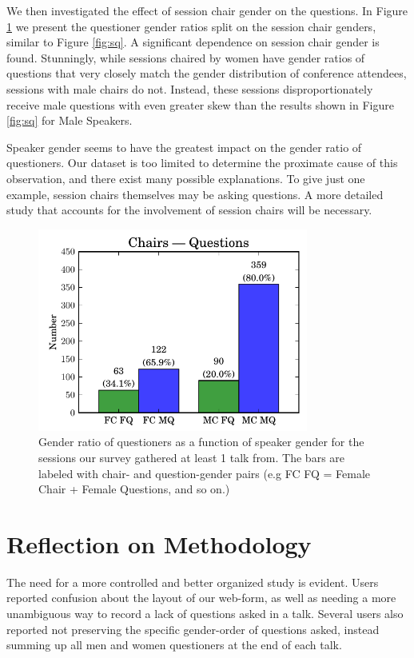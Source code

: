 \documentclass[iop]{emulateapj}
\begin{document}
We then investigated the effect of session chair gender on the questions. In Figure \ref{fig:chairs} we present the questioner gender ratios split on the session chair genders, similar to Figure \ref{fig:sq}. A significant dependence on session chair gender is found. Stunningly, while sessions chaired by women  have gender ratios of questions that very closely match the gender distribution of conference attendees, sessions with male chairs do not. Instead, these sessions disproportionately receive male questions with even greater skew than the results shown in Figure \ref{fig:sq} for Male Speakers. 

Speaker gender seems to have the greatest impact on the gender ratio of questioners. Our dataset is too limited to determine the proximate cause of this observation, and there exist many possible explanations. To give just one example, session chairs themselves may be asking questions. A more detailed study that accounts for the involvement of session chairs will be necessary.


\clearpage


\begin{figure}[!t]
\centering
\includegraphics[width=3.5in]{chairs_questions}
\caption{Gender ratio of questioners as a function of speaker gender for the sessions our survey gathered at least 1 talk from. The bars are labeled with chair- and question-gender pairs (e.g FC FQ = Female Chair + Female Questions, and so on.)}
\label{fig:chairs}
\end{figure}



\section{Reflection on Methodology}
The need for a more controlled and better organized study is evident. Users reported confusion about the layout of our web-form, as well as needing a more unambiguous way to record a lack of questions asked in a talk. Several users also reported not preserving the specific gender-order of questions asked, instead summing up all men and women questioners at the end of each talk.
\end{document}
